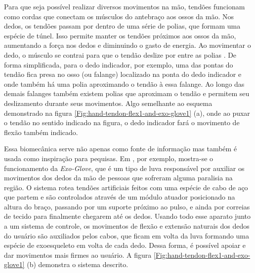 \documentclass[
	12pt,				%
	openright,			%
	oneside,			%
	a4paper,			%
	english,			%
	brazil				%
	]{abntex2}
\begin{document}
		Para que seja possível realizar diversos movimentos na mão, tendões funcionam como cordas que conectam os músculos do antebraço aos ossos da mão. Nos dedos, os tendões passam por dentro de uma série de polias, que formam uma espécie de túnel. Isso permite manter os tendões próximos aos ossos da mão, aumentando a força nos dedos e diminuindo o gasto de energia. Ao movimentar o dedo, o músculo se contrai para que o tendão deslize por entre as polias \cite{drricardocirurgiao}. De forma simplificada, para o dedo indicador, por exemplo, uma das pontas do tendão fica presa no osso (ou falange) localizado na ponta do dedo indicador e onde também há uma polia aproximando o tendão à essa falange. Ao longo das demais falanges também existem polias que aproximam o tendão e permitem seu deslizamento durante seus movimentos. Algo semelhante ao esquema demonstrado na figura \ref{Fig:hand-tendon-flex1-and-exo-glove1} (a), onde ao puxar o tendão no sentido indicado na figura, o dedo indicador fará o movimento de flexão também indicado.




		Essa biomecânica serve não apenas como fonte de informação mas também é usada como inspiração para pequisas. Em \cite{hyunki2015exoglove}, por exemplo, mostra-se o funcionamento da \textit{Exo-Glove}, que é um tipo de luva responsável por auxiliar os movimentos dos dedos da mão de pessoas que sofreram alguma paralisia na região. O sistema rotea tendões artificiais feitos com uma espécie de cabo de aço que partem e são controlados através de um módulo atuador posicionado na altura do braço, passando por um suporte próximo ao pulso, e ainda por correias de tecido para finalmente chegarem até os dedos. Usando todo esse aparato junto a um sistema de controle, os movimentos de flexão e extensão naturais dos dedos do usuário são auxiliados pelos cabos, que ficam em volta da luva formando uma espécie de exoesqueleto em volta de cada dedo. Dessa forma, é possível apoiar e dar movimentos mais firmes ao usuário. A figura \ref{Fig:hand-tendon-flex1-and-exo-glove1} (b) demonstra o sistema descrito.
\end{document}
